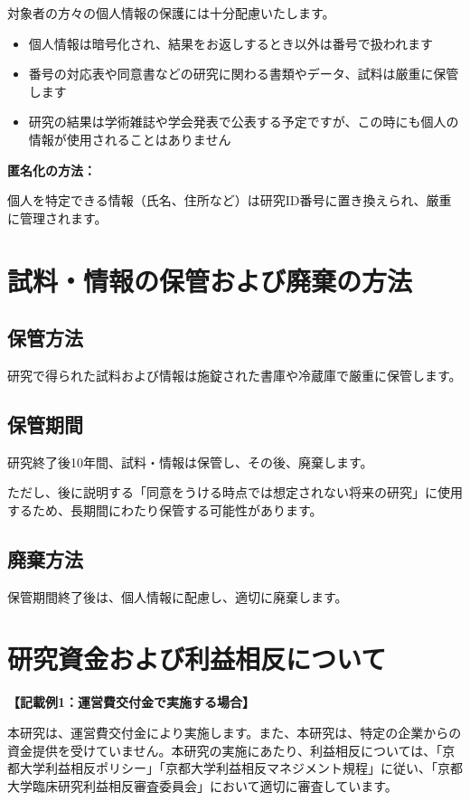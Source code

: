 \documentclass[a4paper,11pt,lualatex,ja=standard]{bxjsarticle}
\begin{document}
対象者の方々の個人情報の保護には十分配慮いたします。

\begin{itemize}
\item 個人情報は暗号化され、結果をお返しするとき以外は番号で扱われます
\item 番号の対応表や同意書などの研究に関わる書類やデータ、試料は厳重に保管します
\item 研究の結果は学術雑誌や学会発表で公表する予定ですが、この時にも個人の情報が使用されることはありません
\end{itemize}

\textbf{匿名化の方法：}

個人を特定できる情報（氏名、住所など）は研究ID番号に置き換えられ、厳重に管理されます。

\section{試料・情報の保管および廃棄の方法}

\subsection{保管方法}

研究で得られた試料および情報は施錠された書庫や冷蔵庫で厳重に保管します。

\subsection{保管期間}

研究終了後10年間、試料・情報は保管し、その後、廃棄します。

ただし、後に説明する「同意をうける時点では想定されない将来の研究」に使用するため、長期間にわたり保管する可能性があります。

\subsection{廃棄方法}

保管期間終了後は、個人情報に配慮し、適切に廃棄します。

\section{研究資金および利益相反について}

\textbf{【記載例1：運営費交付金で実施する場合】}

本研究は、運営費交付金により実施します。また、本研究は、特定の企業からの資金提供を受けていません。本研究の実施にあたり、利益相反については、「京都大学利益相反ポリシー」「京都大学利益相反マネジメント規程」に従い、「京都大学臨床研究利益相反審査委員会」において適切に審査しています。
\end{document}
